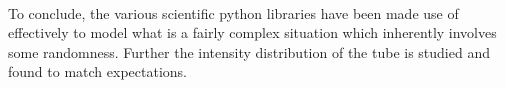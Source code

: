 \documentclass[a4paper, 11pt, margin= 1.25cm]{article}
\begin{document}
\begin{multicols}{2}
\paragraph{} To conclude, the various scientific python libraries have been made use
of effectively to model what is a fairly complex situation which
inherently involves some randomness. Further the intensity distribution
of the tube is studied and found to match expectations.


    \end{multicols}
    
    
    
\end{document}
